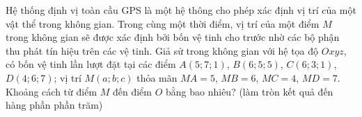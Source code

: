 \begin{ex}%
	Hệ thống định vị toàn cầu GPS là một hệ thông cho phép xác định vị trí của một vật thể trong không gian. Trong cùng một thời điểm, vị trí của một điểm $M$ trong không gian sẽ được xác định bởi bốn vệ tinh cho trước nhờ các bộ phận thu phát tín hiệu trên các vệ tinh. Giả sử trong không gian với hệ tọa độ $Oxyz$, có bốn vệ tinh lần lượt đặt tại các điểm $A(5; 7; 1)$, $B(6; 5; 5)$, $C(6; 3; 1)$, $D(4; 6; 7)$; vị trí $M(a; b; c)$ thỏa mãn $MA=5$, $MB=6$, $MC=4$, $MD=7$. Khoảng cách từ điểm $M$ đến điểm $O$ bằng bao nhiêu? (làm tròn kết quả đến hàng phần phần trăm)
\end{ex}

